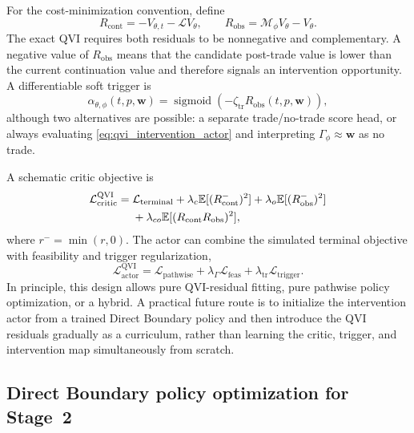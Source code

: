 \documentclass[a4paper,10pt]{article}
\newcommand{\E}{\mathbb{E}}
\newcommand{\bw}{\bm{w}}
\begin{document}
For the cost-minimization convention, define
\begin{equation}
R_{\mathrm{cont}}=-V_{\theta,t}-\mathcal LV_\theta,
\qquad
R_{\mathrm{obs}}=\mathcal M_\phi V_\theta-V_\theta.
\label{eq:qvi_residuals_main}
\end{equation}
The exact QVI requires both residuals to be nonnegative and complementary. A negative value of $R_{\mathrm{obs}}$ means that the candidate post-trade value is lower than the current continuation value and therefore signals an intervention opportunity. A differentiable soft trigger is
\begin{equation}
\alpha_{\theta,\phi}(t,p,\bw)
=\operatorname{sigmoid}\left(-\zeta_{\mathrm{tr}}
R_{\mathrm{obs}}(t,p,\bw)\right),
\label{eq:qvi_soft_trigger}
\end{equation}
although two alternatives are possible: a separate trade/no-trade score head, or always evaluating \eqref{eq:qvi_intervention_actor} and interpreting $\Gamma_\phi\approx\bw$ as no trade.

A schematic critic objective is
\begin{align}
\mathcal L_{\mathrm{critic}}^{\mathrm{QVI}}
={}&\mathcal L_{\mathrm{terminal}}
+\lambda_c\E[(R_{\mathrm{cont}}^-)^2]
+\lambda_o\E[(R_{\mathrm{obs}}^-)^2] \notag\\
&+\lambda_{co}\E[(R_{\mathrm{cont}}R_{\mathrm{obs}})^2],
\label{eq:qvi_critic_loss_main}
\end{align}
where $r^-=\min(r,0)$. The actor can combine the simulated terminal objective with feasibility and trigger regularization,
\begin{equation}
\mathcal L_{\mathrm{actor}}^{\mathrm{QVI}}
=\mathcal L_{\mathrm{pathwise}}
+\lambda_\Gamma\mathcal L_{\mathrm{feas}}
+\lambda_{\mathrm{tr}}\mathcal L_{\mathrm{trigger}}.
\label{eq:qvi_actor_loss_main}
\end{equation}
In principle, this design allows pure QVI-residual fitting, pure pathwise policy optimization, or a hybrid. A practical future route is to initialize the intervention actor from a trained Direct Boundary policy and then introduce the QVI residuals gradually as a curriculum, rather than learning the critic, trigger, and intervention map simultaneously from scratch.

\subsection{Direct Boundary policy optimization for Stage~2}
\end{document}
